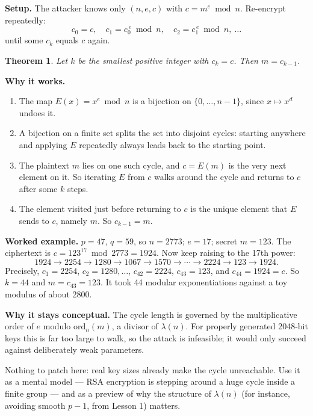 \documentclass[11pt]{article}
\newtheorem{theorem}{Theorem}
\begin{document}
\textbf{Setup.} The attacker knows only $(n,e,c)$ with $c=m^e\bmod n$. Re-encrypt repeatedly:
\[
c_0=c,\quad c_1=c_0^{\,e}\bmod n,\quad c_2=c_1^{\,e}\bmod n,\ \dots
\]
until some $c_k$ equals $c$ again.

\begin{theorem}
Let $k$ be the smallest positive integer with $c_k=c$. Then $m=c_{k-1}$.
\end{theorem}

\textbf{Why it works.}
\begin{enumerate}[nosep]
\item The map $E(x)=x^e \bmod n$ is a bijection on $\{0,\dots,n-1\}$, since $x\mapsto x^d$ undoes it.
\item A bijection on a finite set splits the set into disjoint cycles: starting anywhere and applying $E$ repeatedly always leads back to the starting point.
\item The plaintext $m$ lies on one such cycle, and $c=E(m)$ is the very next element on it. So iterating $E$ from $c$ walks around the cycle and returns to $c$ after some $k$ steps.
\item The element visited just before returning to $c$ is the unique element that $E$ sends to $c$, namely $m$. So $c_{k-1}=m$.
\end{enumerate}

\textbf{Worked example.} $p=47$, $q=59$, so $n=2773$; $e=17$; secret $m=123$. The ciphertext is $c=123^{17}\bmod2773=1924$. Now keep raising to the 17th power:
\[
1924 \to 2254 \to 1280 \to 1067 \to 1570 \to \cdots \to 2224 \to \boxed{123} \to 1924.
\]
Precisely, $c_1=2254$, $c_2=1280,\dots$, $c_{42}=2224$, $c_{43}=123$, and $c_{44}=1924=c$. So $k=44$ and $m=c_{43}=123$. It took 44 modular exponentiations against a toy modulus of about 2800.

\textbf{Why it stays conceptual.} The cycle length is governed by the multiplicative order of $e$ modulo $\mathrm{ord}_n(m)$, a divisor of $\lambda(n)$. For properly generated 2048-bit keys this is far too large to walk, so the attack is infeasible; it would only succeed against deliberately weak parameters.

\begin{fixbox}
Nothing to patch here: real key sizes already make the cycle unreachable. Use it as a mental model --- RSA encryption is stepping around a huge cycle inside a finite group --- and as a preview of why the structure of $\lambda(n)$ (for instance, avoiding smooth $p-1$, from Lesson 1) matters.
\end{fixbox}
\end{document}
